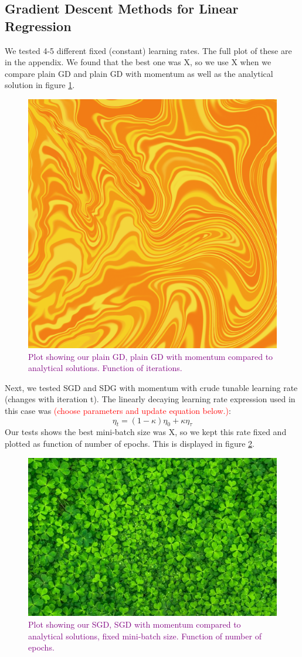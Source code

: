 \subsection{Gradient Descent Methods for Linear Regression}
We tested 4-5 different fixed (constant) learning rates. The full plot of these are in the appendix. We found that the best one was X, so we use X when we compare plain GD and plain GD with momentum as well as the analytical solution in figure \ref{fig:plainVSanalytical}.
\begin{figure}
    \centering
    \includegraphics[width=0.5\linewidth]{figures/placeholders/plainVSanalytical.png}
    \caption{\textcolor{purple}{Plot showing our plain GD, plain GD with momentum compared to analytical solutions. Function of iterations.}}
    \label{fig:plainVSanalytical}
\end{figure}

Next, we tested SGD and SDG with momentum with crude tunable learning rate (changes with iteration t). The linearly decaying learning rate expression used in this case was \textcolor{red}{(choose parameters and update equation below.)}:
\[
\eta_t = (1- \kappa)\eta_0 + \kappa \eta_\tau 
\]
Our tests shows the best mini-batch size was X, so we kept this rate fixed and plotted as function of number of epochs. This is displayed in figure \ref{fig:sgdVSanalytical}.
\begin{figure}
    \centering
    \includegraphics[width=0.5\linewidth]{figures/placeholders/sgdVSanalytical.png}
    \caption{\textcolor{purple}{Plot showing our SGD, SGD with momentum  compared to analytical solutions, fixed mini-batch size. Function of number of epochs.}}
    \label{fig:sgdVSanalytical}
\end{figure}

